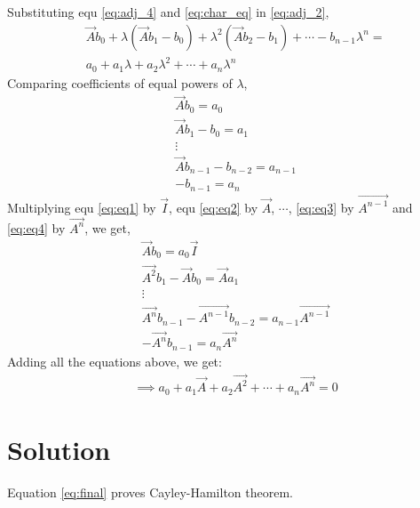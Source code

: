 \documentclass[journal,12pt,twocolumn]{IEEEtran}
\begin{document}
Substituting equ \eqref{eq:adj_4} and \eqref{eq:char_eq}  in \eqref{eq:adj_2},
\begin{align*} 
&\vec{A}b_0 + \lambda(\vec{A}b_1 - b_0) + \lambda^{2}(\vec{A}b_2 - b_1) + \cdots - b_{n-1}\lambda^{n} =\\
&a_0 + a_1\lambda + a_2\lambda^{2} +  \cdots+a_n\lambda^{n}
\end{align*}
Comparing coefficients of equal powers of $\lambda$,
\begin{align}
& \vec{A}b_0 = a_0 \label{eq:eq1}\\
& \vec{A}b_1 - b_0 = a_1 \label{eq:eq2}\\
& \vdots \\
& \vec{A}b_{n-1} - b_{n-2} = a_{n-1} \label{eq:eq3}\\
& -b_{n-1} = a_n \label{eq:eq4}
\end{align}
Multiplying equ \eqref{eq:eq1} by $\vec{I}$, equ \eqref{eq:eq2} by $\vec{A}$, $\cdots$,  \eqref{eq:eq3} by $\vec{A^{n-1}}$ and  \eqref{eq:eq4} by $\vec{A^{n}}$, we get,
\begin{align}
& \vec{A}b_0 = a_0\vec{I} \label{eq:eq5}\\
& \vec{A^{2}}b_1 - \vec{A}b_0 = \vec{A}a_1 \label{eq:eq6}\\
& \vdots \\
& \vec{A^{n}}b_{n-1} - \vec{A^{n-1}}b_{n-2} = a_{n-1}\vec{A^{n-1}} \label{eq:eq7}\\
& -\vec{A^{n}}b_{n-1} = a_n\vec{A^{n}} \label{eq:eq8}
\end{align}
Adding all the equations above, we get:
\begin{align}
&\implies \boxed{a_0 + a_1\vec{A} + a_2\vec{A^{2}} +  \cdots+a_n\vec{A^{n}} = 0} \label{eq:final}
\end{align}
\section{Solution}

Equation \eqref{eq:final} proves Cayley-Hamilton theorem.

\\
\end{document}
